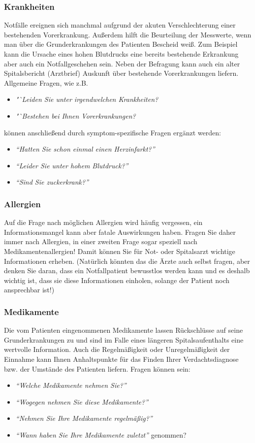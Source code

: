 \subsubsection{Krankheiten}
Notfälle ereignen sich manchmal aufgrund der akuten Verschlechterung einer bestehenden Vorerkrankung. Außerdem hilft die Beurteilung der Messwerte, wenn man über die Grunderkrankungen des Patienten Bescheid weiß. Zum Beispiel kann die Ursache eines hohen Blutdrucks eine bereits bestehende Erkrankung aber auch ein Notfallgeschehen sein. Neben der Befragung kann auch ein alter Spitalsbericht (Arztbrief) Auskunft über bestehende Vorerkrankungen liefern. Allgemeine Fragen, wie z.B.
\begin{itemize}
    \item \emph{"`Leiden Sie unter irgendwelchen
    Krankheiten?}
    \item \emph{"`Bestehen bei Ihnen Vorerkrankungen?}
\end{itemize}
können anschließend durch symptom-spezifische Fragen ergänzt werden:
\begin{itemize}
    \item \emph{"`Hatten Sie schon einmal einen
    Herzinfarkt?"'}
    \item \emph{"`Leider Sie unter hohem Blutdruck?"'}
    \item \emph{"`Sind Sie zuckerkrank?"'}
\end{itemize}

\subsubsection{Allergien}
Auf die Frage nach möglichen Allergien wird häufig vergessen, ein Informationsmangel kann aber fatale Auswirkungen haben. Fragen Sie daher immer nach Allergien, in einer zweiten Frage sogar speziell nach Medikamentenallergien! Damit können Sie für Not- oder Spitalsarzt wichtige Informationen erheben. (Natürlich könnten das die Ärzte auch selbst fragen, aber denken Sie daran, dass ein Notfallpatient bewusstlos werden kann und es deshalb wichtig ist, dass sie diese Informationen einholen, solange der Patient noch ansprechbar ist!)

\subsubsection{Medikamente}
Die vom Patienten eingenommenen Medikamente lassen Rückschlüsse auf seine Grunderkrankungen zu und sind im Falle eines längeren Spitalsaufenthalts eine wertvolle Information. Auch die Regelmäßigkeit oder Unregelmäßigkeit der Einnahme kann Ihnen Anhaltspunkte für das Finden Ihrer Verdachtsdiagnose bzw. der Umstände des Patienten liefern. Fragen können sein:
\begin{itemize}
    \item \emph{"`Welche Medikamente nehmen Sie?"'}
    \item \emph{"`Wogegen nehmen Sie diese Medikamente?"'}
    \item \emph{"`Nehmen Sie Ihre Medikamente regelmäßig?"'}
    \item \emph{"`Wann haben Sie Ihre Medikamente zuletzt"'}
    genommen?
\end{itemize}


